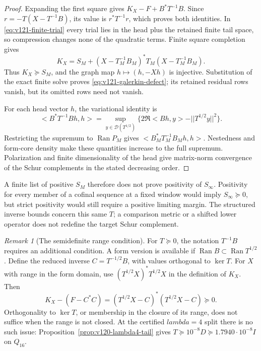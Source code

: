 \documentclass[11pt]{article}
\def\lambda{lambda}%
\def\norm#1{||#1||}%
\def\ip#1#2{<#1,#2>}%
\theoremstyle{remark}
\newtheorem{remark}[theorem]{Remark}
\newcommand{\norm}[1]{\left\lVert #1\right\rVert}
\newcommand{\ip}[2]{\left\langle #1,#2\right\rangle}
\begin{document}
\begin{proof}
Expanding the first square gives $K_X-F+B^*T^{-1}B$.
Since $r=-T(X-T^{-1}B)$, its value is $r^*T^{-1}r$,
which proves both identities. In \eqref{eq:v121-finite-trial}
every trial lies in the head plus the retained finite tail space,
so compression changes none of the quadratic terms. Finite square completion gives
\[
 K_X=S_M+(X-T_M^{-1}B_M)^*T_M(X-T_M^{-1}B_M).
\]
Thus $K_X\succeq S_M$, and the graph map $h\mapsto(h,-Xh)$ is
injective. Substitution of the exact finite solve proves
\eqref{eq:v121-galerkin-defect}; its retained residual rows vanish,
but its omitted rows need not vanish.

For each head vector $h$, the variational identity is
\[
 \ip{B^*T^{-1}Bh}{h}
 =\sup_{y\in\mathcal D(T^{1/2})}
 \{2\Re\ip{Bh}{y}-\norm{T^{1/2}y}^2\}.
\]
Restricting the supremum to $\operatorname{Ran}P_M$ gives
$\ip{B_M^*T_M^{-1}B_Mh}{h}$. Nestedness and form-core density make
these quantities increase to the full supremum. Polarization and
finite dimensionality of the head give matrix-norm convergence of
the Schur complements in the stated decreasing order.
\end{proof}

A finite list of positive $S_M$ therefore does not prove positivity
of $S_\infty$. Positivity for every member of a cofinal sequence at
a fixed window would imply $S_\infty\succeq0$, but strict positivity
would still require a positive limiting margin. The structured inverse
bounds concern this same $T$; a comparison metric or a shifted lower
operator does not redefine the target Schur complement.

\begin{remark}[The semidefinite range condition]\label{rem:v121-range}
For $T\succeq0$, the notation $T^{-1}B$ requires an additional
condition. A form version is available if
$\operatorname{Ran}B\subset\operatorname{Ran}T^{1/2}$. Define the
reduced inverse $C=T^{-1/2}B$, with values orthogonal to $\ker T$.
For $X$ with range in the form domain, use
$(T^{1/2}X)^*T^{1/2}X$ in the definition of $K_X$. Then
\[
 K_X-(F-C^*C)=(T^{1/2}X-C)^*(T^{1/2}X-C)\succeq0.
\]
Orthogonality to $\ker T$, or membership in the closure of its range,
does not suffice when the range is not closed. At the certified
$\lambda=4$ split there is no such issue:
Proposition~\ref{prop:v120-lambda4-tail} gives
$T\succeq10^{-8}D\succeq1.7940\cdot10^{-8}I$ on $Q_{16}$.
\end{remark}
\end{document}
